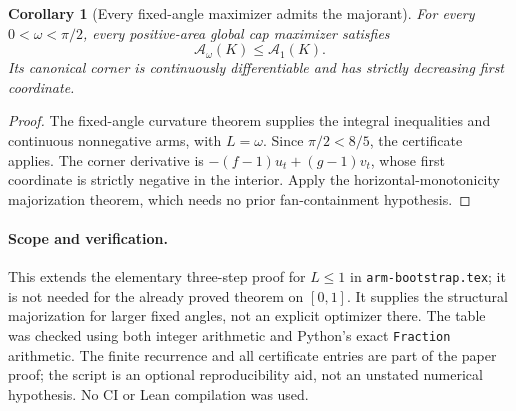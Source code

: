 \documentclass[11pt]{article}
\newtheorem{corollary}{Corollary}
\begin{document}
\begin{corollary}[Every fixed-angle maximizer admits the majorant]
For every $0<\omega<\pi/2$, every positive-area global cap maximizer satisfies
\[
 \mathcal A_\omega(K)\le\mathcal A_1(K).
\]
Its canonical corner is continuously differentiable and has strictly decreasing first coordinate.
\end{corollary}
\begin{proof}
The fixed-angle curvature theorem supplies the integral inequalities and continuous nonnegative arms, with $L=\omega$. Since $\pi/2<8/5$, the certificate applies. The corner derivative is $-(f-1)u_t+(g-1)v_t$, whose first coordinate is strictly negative in the interior. Apply the horizontal-monotonicity majorization theorem, which needs no prior fan-containment hypothesis.
\end{proof}

\paragraph{Scope and verification.}
This extends the elementary three-step proof for $L\le1$ in \texttt{arm-bootstrap.tex}; it is not needed for the already proved theorem on $[0,1]$. It supplies the structural majorization for larger fixed angles, not an explicit optimizer there. The table was checked using both integer arithmetic and Python's exact \texttt{Fraction} arithmetic. The finite recurrence and all certificate entries are part of the paper proof; the script is an optional reproducibility aid, not an unstated numerical hypothesis. No CI or Lean compilation was used.
\end{document}

